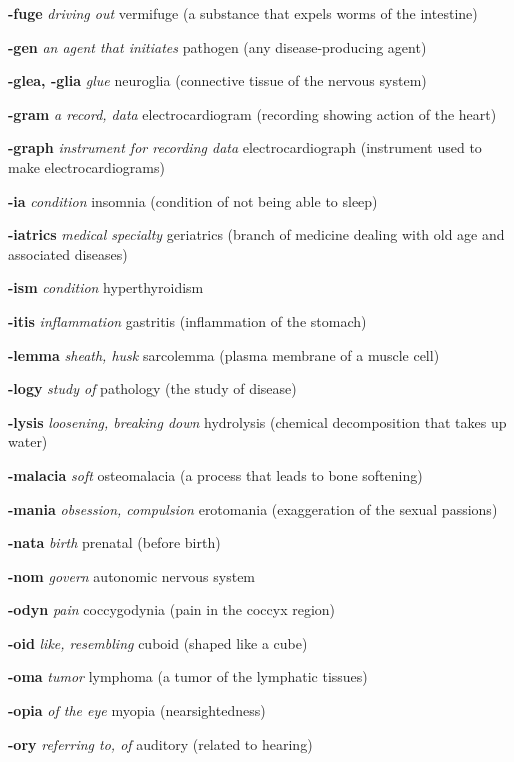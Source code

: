 \documentclass[10pt]{article}
\begin{document}
\begin{multicols}{2}
\begin{hangparas}{10pt}{1}
 \textbf{-fuge} \textit{driving out} vermifuge (a substance that expels worms of the intestine) \par
 \textbf{-gen} \textit{an agent that initiates} pathogen (any disease-producing agent) \par
 \textbf{-glea, -glia} \textit{glue} neuroglia (connective tissue of the nervous system) \par
 \textbf{-gram} \textit{a record, data} electrocardiogram (recording showing action of the heart) \par
 \textbf{-graph} \textit{instrument for recording data} electrocardiograph (instrument used to make electrocardiograms) \par
 \textbf{-ia} \textit{condition} insomnia (condition of not being able to sleep) \par
 \textbf{-iatrics} \textit{medical specialty} geriatrics (branch of medicine dealing with old age and associated diseases) \par
 \textbf{-ism} \textit{condition} hyperthyroidism \par
 \textbf{-itis} \textit{inflammation} gastritis (inflammation of the stomach) \par
 \textbf{-lemma} \textit{sheath, husk} sarcolemma (plasma membrane of a muscle cell) \par
 \textbf{-logy} \textit{study of} pathology (the study of disease) \par
 \textbf{-lysis} \textit{loosening, breaking down} hydrolysis (chemical decomposition that takes up water) \par
 \textbf{-malacia} \textit{soft} osteomalacia (a process that leads to bone softening) \par
 \textbf{-mania} \textit{obsession, compulsion} erotomania (exaggeration of the sexual passions) \par
 \textbf{-nata} \textit{birth} prenatal (before birth) \par
 \textbf{-nom} \textit{govern} autonomic nervous system \par
 \textbf{-odyn} \textit{pain} coccygodynia (pain in the coccyx region) \par
 \textbf{-oid} \textit{like, resembling} cuboid (shaped like a cube) \par
 \textbf{-oma} \textit{tumor} lymphoma (a tumor of the lymphatic tissues) \par
 \textbf{-opia} \textit{of the eye} myopia (nearsightedness) \par
 \textbf{-ory} \textit{referring to, of} auditory (related to hearing) \par

\end{hangparas}
\end{multicols}
\end{document}
